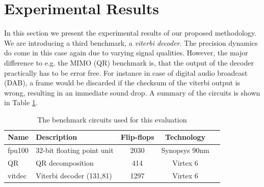 \documentclass[conference]{IEEEtran}
\begin{document}
\section{Experimental Results}
\label{sec:experimental_results}
In this section we present the experimental results of our proposed methodology. We are introducing a third benchmark, a \emph{viterbi decoder}. The precision dynamics do come in this case again due to varying signal qualities. However, the major difference to e.g. the MIMO (QR) benchmark is, that the output of the decoder practically has to be error free. For instance in case of digital audio broadcast (DAB), a frame would be discarded if the checksum of the viterbi output is wrong, resulting in an immediate sound drop. A summary of the circuits is shown in Table \ref{tab:benchmark_circuits}.
\begin{table}[htb]
\caption{The benchmark circuits used for this evaluation}
\label{tab:benchmark_circuits}
\centering
\begin{tabular} {| l | l | c | c | c |}
\hline
Name & Description  & Flip-flops & Technology\\
\hline\hline
fpu100 \cite{al2007fpu100} & 32-bit floating point unit  & 2030 & Synopsys 90nm\\
QR \cite{gimmler-dumont_asic_2013} & QR decomposition  & 414 & Virtex 6\\
vitdec \cite{fehrenz2014viterbi} & Viterbi decoder (131,81)  & 1297 & Virtex 6\\
\hline
\end{tabular}
\end{table}
\end{document}
